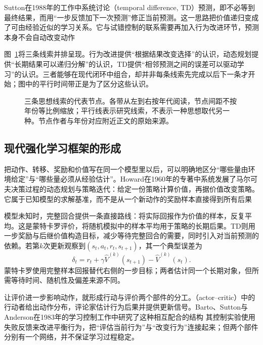 Sutton在1988年的工作中系统讨论（temporal difference, TD）预测，即不必等到最终结果，而用“一步反馈加下一次预测”修正当前预测。这一思路把价值递归变成了可由经验近似的学习关系。它与试错控制的联系需要再加入行为改进环节，预测本身不会自动改变动作

图~\ref{fig:rl-overview-history}将三条线索并排呈现。行为改进提供“根据结果改变选择”的认识，动态规划提供“长期结果可以递归分解”的认识，TD提供“相邻预测之间的误差可以驱动学习”的认识。三者能够在现代闭环中组合，却并非每条线索先完成以后下一条才开始；图中的平行时间带正是为了区分这些认识。

\begin{figure}[htbp]
  \centering
  
  \caption{三条思想线索的代表节点。各带从左到右按年代阅读，节点间距不按年份等比例缩放；平行线表示研究线索，不表示一种思想取代另一种。节点作者与年份对应附近正文的原始来源。}
  \label{fig:rl-overview-history}
\end{figure}

\subsection{现代强化学习框架的形成}
\label{sec:rl-overview-modern}

把动作、转移、奖励和价值写在同一个模型里以后，可以明确地区分“哪些量由环境给定”与“哪些量必须从经验估计”。Howard在1960年的专著中系统发展了马尔可夫决策过程的动态规划与策略迭代：给定一份策略计算价值，再据价值改变策略。它属于已知模型的求解基准，而不是从一个新动作的奖励样本直接得到所有后果

模型未知时，完整回合提供一条直接路线：将实际回报作为价值的样本，反复平均。这是蒙特卡罗评价，将随机模拟中的样本平均用于策略的长期后果。TD则用一步奖励与后继价值构造目标，减少等待完整回合的需要，同时引入对当前预测的依赖。若第$k$次更新观察到$(s_t,a_t,r_t,s_{t+1})$，其一个典型误差为
\[
  \delta_t=r_t+\gamma\widehat V^{(k)}(s_{t+1})
                    -\widehat V^{(k)}(s_t).
\]
蒙特卡罗使用完整样本回报替代右侧的一步目标；两者估计同一个长期对象，但所需等待时间、随机性及偏差来源不同。

让评价进一步影响动作，就形成行动与评价两个部件的分工。（actor--critic）中的行动者给出动作分布，评论家估计行为后果并提供更新信号。Barto、Sutton与Anderson在1983年的学习控制工作中研究了这种相互配合的结构
其控制实验使用失败反馈来改进平衡行为，把“评估当前行为”与“改变行为”连接起来；但两个部件分别有一个网络，并不保证学习过程稳定。

